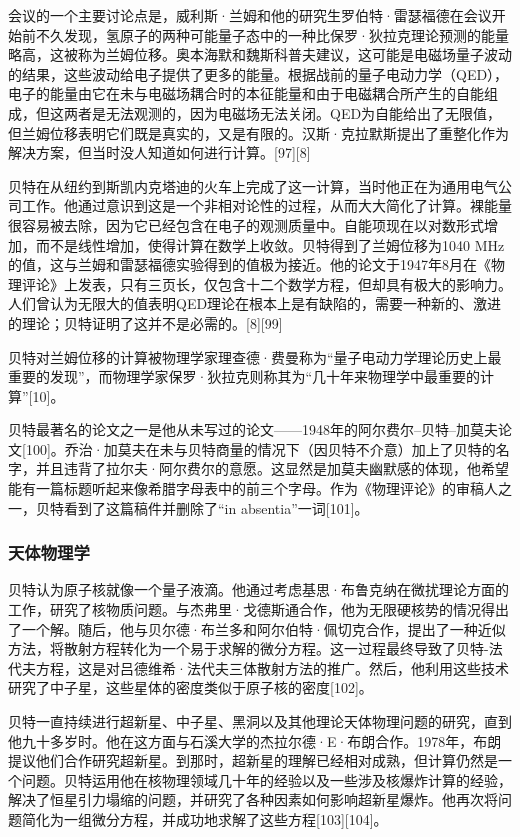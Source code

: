 会议的一个主要讨论点是，威利斯·兰姆和他的研究生罗伯特·雷瑟福德在会议开始前不久发现，氢原子的两种可能量子态中的一种比保罗·狄拉克理论预测的能量略高，这被称为兰姆位移。奥本海默和魏斯科普夫建议，这可能是电磁场量子波动的结果，这些波动给电子提供了更多的能量。根据战前的量子电动力学（QED），电子的能量由它在未与电磁场耦合时的本征能量和由于电磁耦合所产生的自能组成，但这两者是无法观测的，因为电磁场无法关闭。QED为自能给出了无限值，但兰姆位移表明它们既是真实的，又是有限的。汉斯·克拉默斯提出了重整化作为解决方案，但当时没人知道如何进行计算。[97][8]

贝特在从纽约到斯凯内克塔迪的火车上完成了这一计算，当时他正在为通用电气公司工作。他通过意识到这是一个非相对论性的过程，从而大大简化了计算。裸能量很容易被去除，因为它已经包含在电子的观测质量中。自能项现在以对数形式增加，而不是线性增加，使得计算在数学上收敛。贝特得到了兰姆位移为1040 MHz的值，这与兰姆和雷瑟福德实验得到的值极为接近。他的论文于1947年8月在《物理评论》上发表，只有三页长，仅包含十二个数学方程，但却具有极大的影响力。人们曾认为无限大的值表明QED理论在根本上是有缺陷的，需要一种新的、激进的理论；贝特证明了这并不是必需的。[8][99]

贝特对兰姆位移的计算被物理学家理查德·费曼称为“量子电动力学理论历史上最重要的发现”，而物理学家保罗·狄拉克则称其为“几十年来物理学中最重要的计算”[10]。

贝特最著名的论文之一是他从未写过的论文——1948年的阿尔费尔–贝特–加莫夫论文[100]。乔治·加莫夫在未与贝特商量的情况下（因贝特不介意）加上了贝特的名字，并且违背了拉尔夫·阿尔费尔的意愿。这显然是加莫夫幽默感的体现，他希望能有一篇标题听起来像希腊字母表中的前三个字母。作为《物理评论》的审稿人之一，贝特看到了这篇稿件并删除了“in absentia”一词[101]。
\subsubsection{天体物理学} 
贝特认为原子核就像一个量子液滴。他通过考虑基思·布鲁克纳在微扰理论方面的工作，研究了核物质问题。与杰弗里·戈德斯通合作，他为无限硬核势的情况得出了一个解。随后，他与贝尔德·布兰多和阿尔伯特·佩切克合作，提出了一种近似方法，将散射方程转化为一个易于求解的微分方程。这一过程最终导致了贝特-法代夫方程，这是对吕德维希·法代夫三体散射方法的推广。然后，他利用这些技术研究了中子星，这些星体的密度类似于原子核的密度[102]。

贝特一直持续进行超新星、中子星、黑洞以及其他理论天体物理问题的研究，直到他九十多岁时。他在这方面与石溪大学的杰拉尔德·E·布朗合作。1978年，布朗提议他们合作研究超新星。到那时，超新星的理解已经相对成熟，但计算仍然是一个问题。贝特运用他在核物理领域几十年的经验以及一些涉及核爆炸计算的经验，解决了恒星引力塌缩的问题，并研究了各种因素如何影响超新星爆炸。他再次将问题简化为一组微分方程，并成功地求解了这些方程[103][104]。

